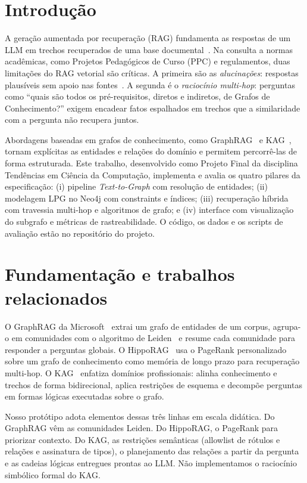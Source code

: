 \documentclass[12pt]{article}
\begin{document}
\section{Introdução}

A geração aumentada por recuperação (RAG) fundamenta as respostas de um LLM em trechos
recuperados de uma base documental~\cite{lewis2020rag}. Na consulta a normas
acadêmicas, como Projetos Pedagógicos de Curso (PPC) e regulamentos, duas limitações do
RAG vetorial são críticas. A primeira são as \emph{alucinações}: respostas plausíveis sem
apoio nas fontes~\cite{ji2023hallucination}. A segunda é o \emph{raciocínio multi-hop}:
perguntas como ``quais são todos os pré-requisitos, diretos e indiretos, de Grafos de
Conhecimento?'' exigem encadear fatos espalhados em trechos que a similaridade com a
pergunta não recupera juntos.

Abordagens baseadas em grafos de conhecimento, como GraphRAG~\cite{edge2024graphrag,peng2024survey}
e KAG~\cite{liang2024kag}, tornam explícitas as entidades e relações do domínio e permitem
percorrê-las de forma estruturada. Este trabalho, desenvolvido como Projeto Final da
disciplina Tendências em Ciência da Computação, implementa e avalia os quatro pilares da
especificação: (i) pipeline \emph{Text-to-Graph} com resolução de entidades; (ii)
modelagem LPG no Neo4j com constraints e índices; (iii) recuperação híbrida com travessia
multi-hop e algoritmos de grafo; e (iv) interface com visualização do subgrafo e
métricas de rastreabilidade. O código, os dados e os scripts de avaliação estão no
repositório do projeto.

\section{Fundamentação e trabalhos relacionados}

O GraphRAG da Microsoft~\cite{edge2024graphrag} extrai um grafo de entidades de um
corpus, agrupa-o em comunidades com o algoritmo de Leiden~\cite{traag2019leiden} e
resume cada comunidade para responder a perguntas globais. O HippoRAG~\cite{gutierrez2024hipporag}
usa o PageRank personalizado~\cite{page1999pagerank} sobre um grafo de conhecimento como
memória de longo prazo para recuperação multi-hop. O KAG~\cite{liang2024kag} enfatiza
domínios profissionais: alinha conhecimento e trechos de forma bidirecional, aplica
restrições de esquema e decompõe perguntas em formas lógicas executadas sobre o grafo.

Nosso protótipo adota elementos dessas três linhas em escala didática. Do GraphRAG vêm
as comunidades Leiden. Do HippoRAG, o PageRank para priorizar contexto. Do KAG, as
restrições semânticas (allowlist de rótulos e relações e assinatura de tipos), o
planejamento das relações a partir da pergunta e as cadeias lógicas entregues prontas
ao LLM. Não implementamos o raciocínio simbólico formal do KAG.
\end{document}

